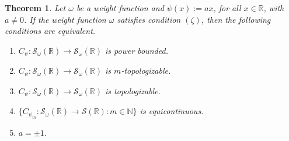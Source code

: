 \documentclass[12pt,reqno]{amsart} %
\newtheorem{theorem}{Theorem}[section]
\numberwithin{equation}{section}
\begin{document}
				
				\begin{theorem}\label{Ctopol} Let $\omega$ be a weight function and
					$\psi(x):=a x$, for all $x\in\mathbb{R}$, with $a\not=0$. If the weight function $\omega$ satisfies condition $(\zeta)$, then the following conditions are equivalent.
					\begin{enumerate}
						\item $C_\psi\colon \mathcal{S}_\omega(\mathbb{R})\to \mathcal{S}_\omega(\mathbb{R})$ is power bounded.
						\item $C_\psi\colon \mathcal{S}_\omega(\mathbb{R})\to \mathcal{S}_\omega(\mathbb{R})$ is $m$-topologizable.
						\item  $C_\psi\colon \mathcal{S}_\omega(\mathbb{R})\to \mathcal{S}_\omega(\mathbb{R})$ is topologizable.
						\item $\{C_{\psi_m}: \mathcal{S}_{\omega}(\mathbb{R})\to \mathcal{S}(\mathbb{R}): m\in\mathbb{N}\}$ 
						is equicontinuous.
						\item $a=\pm 1$.
					\end{enumerate} 
				\end{theorem}
\end{document}

